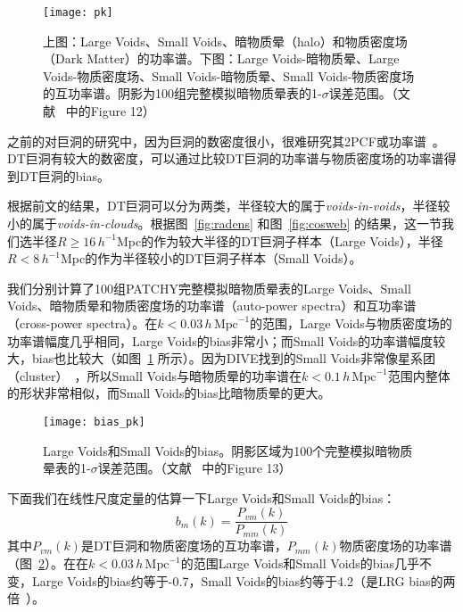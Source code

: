 \begin{figure}
\centering
\texttt{[image: pk]}
\caption{上图：Large Voids、Small Voids、暗物质晕（halo）和物质密度场（Dark Matter）的功率谱。下图：Large Voids-暗物质晕、Large Voids-物质密度场、Small Voids-暗物质晕、Small Voids-物质密度场的互功率谱。阴影为100组完整模拟暗物质晕表的1-$\sigma$误差范围。（文献 ~中的Figure 12）}
\label{fig:pk}
\end{figure}

之前的对巨洞的研究中，因为巨洞的数密度很小，很难研究其2PCF或功率谱~\cite{Padilla2005,Patiri2006372,VBT12,CC13,CJS15}。DT巨洞有较大的数密度，可以通过比较DT巨洞的功率谱与物质密度场的功率谱得到DT巨洞的bias。

根据前文的结果，DT巨洞可以分为两类，半径较大的属于\textit{voids-in-voids}，半径较小的属于\textit{voids-in-clouds}。根据图~\ref{fig:radens} 和图~\ref{fig:cosweb} 的结果，这一节我们选半径$R \geq 16\,h^{-1}$Mpc的作为较大半径的DT巨洞子样本（Large Voids），半径$R < 8\,h^{-1}$Mpc的作为半径较小的DT巨洞子样本（Small Voids）。

我们分别计算了100组\textsc{PATCHY}完整模拟暗物质晕表的Large Voids、Small Voids、暗物质晕和物质密度场的功率谱（auto-power spectra）和互功率谱（cross-power spectra）。在$k < 0.03\,h\,\mathrm{Mpc}^{-1}$的范围，Large Voids与物质密度场的功率谱幅度几乎相同，Large Voids的bias非常小；而Small Voids的功率谱幅度较大，bias也比较大（如图~\ref{fig:pk} 所示）。因为DIVE找到的Small Voids非常像星系团（cluster）~\cite{Marinoni2002}，所以Small Voids与暗物质晕的功率谱在$k < 0.1\,h\,\mathrm{Mpc}^{-1}$范围内整体的形状非常相似，而Small Voids的bias比暗物质晕的更大。

\begin{figure}
\centering
\texttt{[image: bias\_pk]}
\caption{Large Voids和Small Voids的bias。阴影区域为100个完整模拟暗物质晕表的1-$\sigma$误差范围。（文献 ~中的Figure 13）}
\label{fig:bias_dp}
\end{figure}

下面我们在线性尺度定量的估算一下Large Voids和Small Voids的bias：
\begin{equation}
b_m (k) = \frac{P_{vm}(k)}{P_{mm}(k)}
\end{equation}
其中$P_{vm}(k)$是DT巨洞和物质密度场的互功率谱，$P_{mm}(k)$物质密度场的功率谱（图~\ref{fig:bias_dp}）。在在$k < 0.03\,h\,\mathrm{Mpc}^{-1}$的范围Large Voids和Small Voids的bias几乎不变，Large Voids的bias约等于-0.7，Small Voids的bias约等于4.2（是LRG bias的两倍~\cite{Tegmark2006}）。
